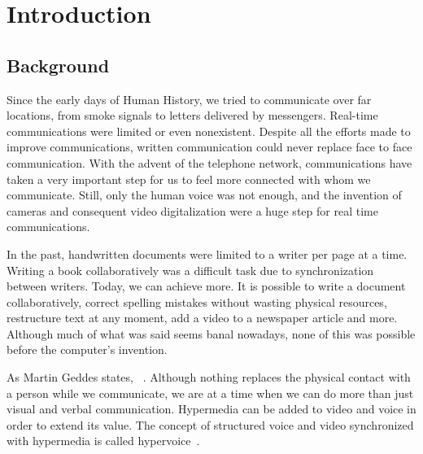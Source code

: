 \chapter{Introduction}
\label{chapter:introduction}

\section{Background}
\label{section:background}

	Since the early days of Human History, we tried to communicate over far locations, from smoke signals to letters delivered by messengers. Real-time communications were limited or even nonexistent. Despite all the efforts made to improve communications, written communication could never replace face to face communication.
	With the advent of the telephone network, communications have taken a very important step for us to feel more connected with whom we communicate. Still, only the human voice was not enough, and the invention of cameras and consequent video digitalization were a huge step for real time communications.

	In the past, handwritten documents were limited to a writer per page at a time. Writing a book collaboratively was a difficult task due to synchronization between writers.
	Today, we can achieve more. It is possible to write a document collaboratively, correct spelling mistakes without wasting physical resources, restructure text at any moment, add a video to a newspaper article and more. Although much of what was said seems banal nowadays, none of this was possible before the computer's invention. 

	As Martin Geddes states, ~\cite{geddes}. Although nothing replaces the physical contact with a person while we communicate, we are at a time when we can do more than just visual and verbal communication. Hypermedia can be added to video and voice in order to extend its value. The concept of structured voice and video synchronized with hypermedia is called hypervoice~\cite{geddes}.

